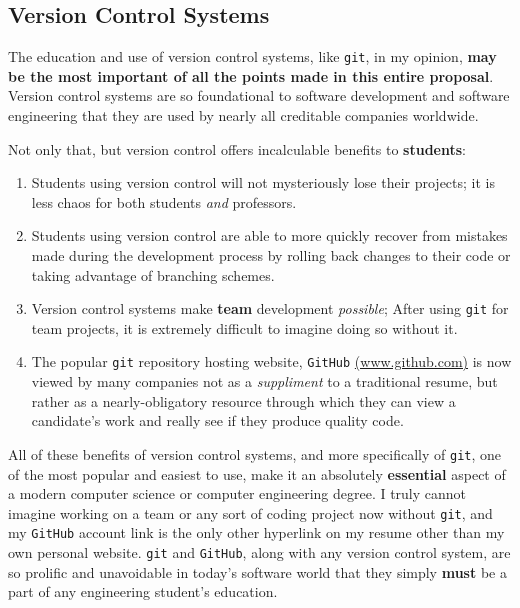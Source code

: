 \documentclass[12pt]{article}
\numberwithin{figure}{section}
\numberwithin{equation}{section}
\begin{document}
{\subsection{Version Control Systems}\label{git}
The education and use of version control systems, like \texttt{git}, in
my opinion, \textbf{may be the most important of all the points made in
this entire proposal}. Version control systems are so foundational to
software development and software engineering that they are used by
nearly all creditable companies worldwide.

\bigskip

Not only that, but version control offers incalculable benefits to
\textbf{students}:

\begin{enumerate}
\itemsep1pt\parskip0pt
\item   Students using version control will not mysteriously lose their
        projects; it is less chaos for both students \emph{and} professors.
\item   Students using version control are able to more quickly recover from
        mistakes made during the development process by rolling back changes
        to their code or taking advantage of branching schemes.
\item   Version control systems make \textbf{team} development
        \emph{possible}; After using \texttt{git} for team projects, it is
        extremely difficult to imagine doing so without it.
\item   The popular \texttt{git} repository hosting website, \texttt{GitHub}
        \href{https://www.github.com}{(www.github.com)} is now viewed by many
        companies not as a \emph{suppliment} to a traditional resume, but
        rather as a nearly-obligatory resource through which they can view a
        candidate's work and really see if they produce quality code.
\end{enumerate}

All of these benefits of version control systems, and more specifically
of \texttt{git}, one of the most popular and easiest to use, make it an
absolutely \textbf{essential} aspect of a modern computer science or
computer engineering degree. I truly cannot imagine working on a team or
any sort of coding project now without \texttt{git}, and my
\texttt{GitHub} account link is the only other hyperlink on my resume
other than my own personal website. \texttt{git} and \texttt{GitHub},
along with any version control system, are so prolific and unavoidable
in today's software world that they simply \textbf{must} be a part of
any engineering student's education.

}
\end{document}
